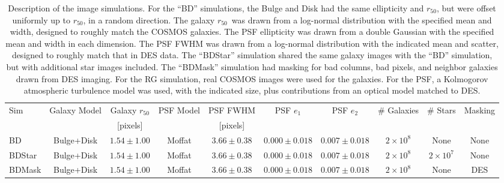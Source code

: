 \documentclass[usegraphicx,usenatbib]{mn2e}
\newcommand{\hlr}{$r_{50}$}
\newcommand{\nsimNgal}{$10^8$}
\newcommand{\nsimNgalTwo}{$2 \times 10^8$}
\newcommand{\nsimNStar}{$10^7$}
\newcommand{\nsimNStarTwo}{$2 \times 10^7$}
\newcommand{\psfeonedist}{$0.000  \pm 0.018$}
\newcommand{\psfetwodist}{$0.007 \pm 0.018$}
\newcommand{\psfrdist}{$3.66 \pm 0.38$}
\newcommand{\galrdist}{$1.54 \pm 1.00$}
\begin{document}
\begin{table}
    \centering
    \caption{Description of the image simulations.  For the ``BD'' simulations,
        the Bulge and Disk had the same ellipticity and \hlr, but were offset
        uniformly up to \hlr, in a random direction.  The galaxy \hlr\ was drawn
        from a log-normal distribution with the specified mean and width, designed
        to roughly match the COSMOS galaxies.  The PSF ellipticity was
        drawn from a double Gaussian with the specified mean and width in each
        dimension.  The PSF FWHM was drawn from a log-normal distribution with
        the indicated mean and scatter, designed to roughly match
        that in DES data.  The ``BDStar'' simulation shared the
        same galaxy images with the ``BD'' simulation, but with additional star
        images included.  The ``BDMask'' simulation had masking for bad columns,
        bad pixels, and neighbor galaxies drawn from DES imaging. For the RG
        simulation, real COSMOS images were used for the galaxies. For
        the PSF, a  Kolmogorov atmospheric turbulence model was used,
        with the indicated size,
        plus contributions from an optical model matched to DES. \label{tab:sims}}
    \begin{tabular}{ | l | c | c | c | c | c | c | c | c | c |}
        Sim          & Galaxy Model & Galaxy \hlr & PSF Model & PSF FWHM & PSF $e_1$      & PSF $e_2$           & \# Galaxies & \# Stars    & Masking   \\
                     &              & [pixels]    &           & [pixels]  &                &                     &             &             &  \\
        \hline
        BD           & Bulge+Disk   & \galrdist   & Moffat    & \psfrdist & \psfeonedist  &\psfetwodist   &  \nsimNgalTwo   & None          & None      \\
        BDStar       & Bulge+Disk   & \galrdist   & Moffat    & \psfrdist & \psfeonedist  &\psfetwodist   &  \nsimNgalTwo   & \nsimNStarTwo & None      \\
        BDMask       & Bulge+Disk   & \galrdist   & Moffat    & \psfrdist & \psfeonedist  &\psfetwodist   &  \nsimNgalTwo   & None          & DES      \\

\end{tabular}
\end{table}
\end{document}

